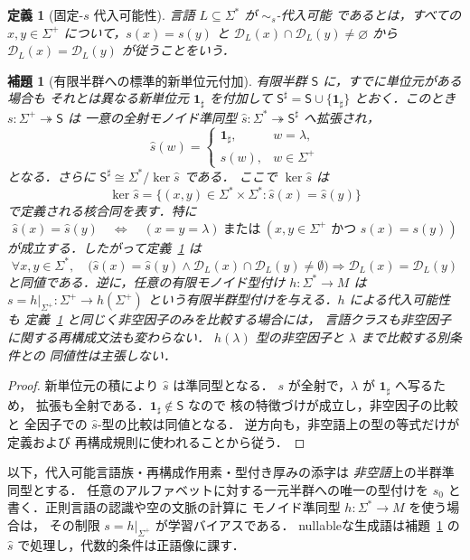 \documentclass[11pt,a4paper]{ltjsarticle}
\newtheorem{lemma}[theorem]{補題}
\newtheorem{definition}[theorem]{定義}
\theoremstyle{remark}
\theoremstyle{plain}
\newcommand{\D}{\mathcal{D}}
\begin{document}
\begin{definition}[固定-$s$ 代入可能性]\label{def:hsubst}
言語 $L\subseteq\Sigma^*$ が \emph{$\sim_s$-代入可能} であるとは，すべての $x,y\in\Sigma^+$ について，$s(x)=s(y)$ と $\D_L(x)\cap\D_L(y)\ne\varnothing$ から $\D_L(x)=\D_L(y)$ が従うことをいう．
\end{definition}
\begin{lemma}[有限半群への標準的新単位元付加]\label{lem:fresh-identity}
有限半群 $\mathsf S$ に，すでに単位元がある場合も
それとは異なる新単位元 $\mathbf{1}_{\sharp}$ を付加して
$\mathsf S^\sharp=\mathsf S\cup\{\mathbf{1}_{\sharp}\}$
とおく．このとき $s:\Sigma^+\twoheadrightarrow\mathsf S$ は
一意の全射モノイド準同型
$\widehat s:\Sigma^*\twoheadrightarrow\mathsf S^\sharp$
へ拡張され，
\[
\widehat s(w)=
\begin{cases}
\mathbf{1}_{\sharp},&w=\lambda,\\
s(w),&w\in\Sigma^+
\end{cases}
\]
となる．さらに
$\mathsf S^\sharp\cong\Sigma^*/\ker\widehat s$ である．
ここで $\ker\widehat s$ は
\[
\ker\widehat s
=\{(x,y)\in\Sigma^*\times\Sigma^*:
\widehat s(x)=\widehat s(y)\}
\]
で定義される核合同を表す．特に
\[
\widehat s(x)=\widehat s(y)\quad\Longleftrightarrow\quad
(x=y=\lambda)\ \text{または}\
(x,y\in\Sigma^+\text{ かつ }s(x)=s(y))
\]
が成立する．したがって定義~\ref{def:hsubst} は
\[
\forall x,y\in\Sigma^*,\quad
\bigl(\widehat s(x)=\widehat s(y)\land
\D_L(x)\cap\D_L(y)\ne\emptyset\bigr)
\Longrightarrow \D_L(x)=\D_L(y)
\]
と同値である．逆に，任意の有限モノイド型付け
$h:\Sigma^*\to M$ は
$s=h|_{\Sigma^+}:\Sigma^+\to h(\Sigma^+)$
という有限半群型付けを与える．$h$ による代入可能性も
定義~\ref{def:hsubst} と同じく\emph{非空因子のみ}を比較する場合には，
言語クラスも非空因子に関する再構成文法も変わらない．
$h(\lambda)$ 型の非空因子と $\lambda$ まで比較する別条件との
同値性は主張しない．
\end{lemma}
\begin{proof}
新単位元の積により $\widehat s$ は準同型となる．
$s$ が全射で，$\lambda$ が $\mathbf{1}_{\sharp}$ へ写るため，
拡張も全射である．$\mathbf{1}_{\sharp}\notin\mathsf S$ なので
核の特徴づけが成立し，非空因子の比較と
全因子での $\widehat s$-型の比較は同値となる．
逆方向も，非空語上の型の等式だけが定義および
再構成規則に使われることから従う．
\end{proof}

以下，代入可能言語族・再構成作用素・型付き厚みの添字は
\emph{非空語}上の半群準同型とする．
任意のアルファベットに対する一元半群への唯一の型付けを
$s_0$ と書く．正則言語の認識や空の文脈の計算に
モノイド準同型 $h:\Sigma^*\to M$ を使う場合は，
その制限 $s=h|_{\Sigma^+}$ が学習バイアスである．
nullableな生成語は補題~\ref{lem:fresh-identity} の
$\widehat s$ で処理し，代数的条件は正語像に課す．
\end{document}
